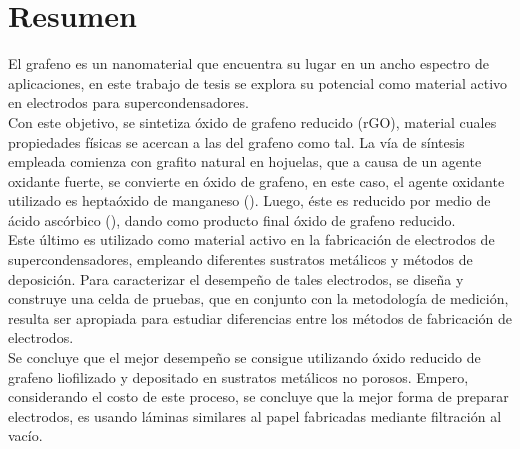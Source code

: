 \chapter*{Resumen}
El grafeno es un nanomaterial que encuentra su lugar en un ancho espectro de aplicaciones, en este trabajo de tesis se explora su potencial como material activo en electrodos para supercondensadores.\\
Con este objetivo, se sintetiza óxido de grafeno reducido (rGO), material cuales propiedades físicas se acercan a las del grafeno como tal. La vía de síntesis empleada comienza con grafito natural en hojuelas, que a causa de un agente oxidante fuerte, se convierte en óxido de grafeno, en este caso, el agente oxidante utilizado es heptaóxido de manganeso (). Luego, éste es reducido por medio de ácido ascórbico (), dando como producto final óxido de grafeno reducido.\\
Este último es utilizado como material activo en la fabricación de electrodos de supercondensadores, empleando diferentes sustratos metálicos y métodos de deposición. Para caracterizar el desempeño de tales electrodos, se diseña y construye una celda de pruebas, que en conjunto con la metodología de medición, resulta ser apropiada para estudiar diferencias entre los métodos de fabricación de electrodos.\\
Se concluye que el mejor desempeño se consigue utilizando óxido reducido de grafeno liofilizado y depositado en sustratos metálicos no porosos. Empero, considerando el costo de este proceso, se concluye que la mejor forma de preparar electrodos, es usando láminas similares al papel fabricadas mediante filtración al vacío.
